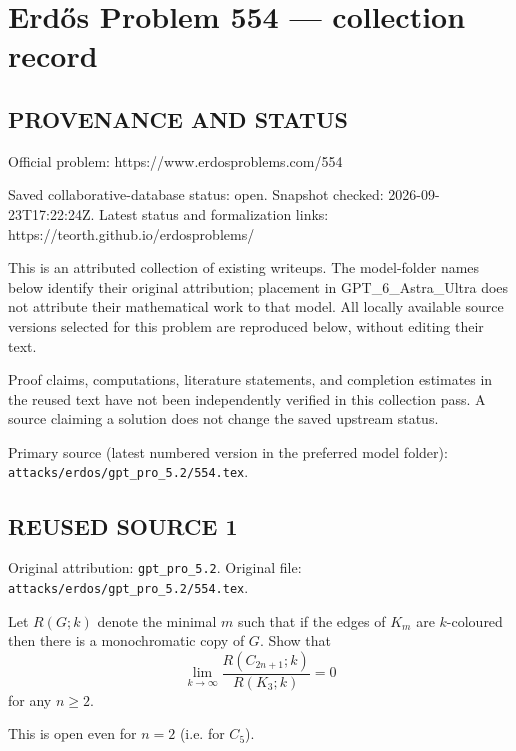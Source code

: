 \section*{Erd\H{o}s Problem 554 --- collection record}

\subsection*{PROVENANCE AND STATUS}
Official problem: https://www.erdosproblems.com/554

Saved collaborative-database status: open.
Snapshot checked: 2026-09-23T17:22:24Z.
Latest status and formalization links: https://teorth.github.io/erdosproblems/

This is an attributed collection of existing writeups. The model-folder names below identify their original attribution; placement in GPT\_6\_Astra\_Ultra does not attribute their mathematical work to that model. All locally available source versions selected for this problem are reproduced below, without editing their text.

Proof claims, computations, literature statements, and completion estimates in the reused text have not been independently verified in this collection pass. A source claiming a solution does not change the saved upstream status.

Primary source (latest numbered version in the preferred model folder): \texttt{attacks/erdos/gpt\_pro\_5.2/554.tex}.

\subsection*{REUSED SOURCE 1}
Original attribution: \texttt{gpt\_pro\_5.2}.
Original file: \texttt{attacks/erdos/gpt\_pro\_5.2/554.tex}.


Let $R(G;k)$ denote the minimal $m$ such that if the edges of $K_m$ are $k$-coloured then there is a monochromatic copy of $G$. Show that 
\[
\lim_{k\to \infty} \frac{R(C_{2n+1};k)}{R(K_3;k)} =0
\]
for any $n\ge 2$.

This is open even for $n=2$ (i.e. for $C_5$).

